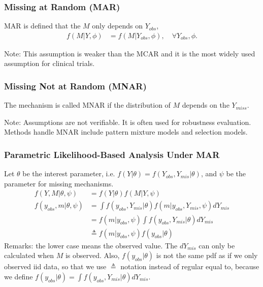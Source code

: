\documentclass[notes=no]{beamer}
\begin{document}
\begin{frame}
	\frametitle{Missing at Random (MAR)}
	\begin{definition}[MAR]
	MAR is defined that the $M$ only depends on $Y_{obs}$,
	\begin{align*}
	f(M | Y, \phi) &= f(M|Y_{obs}, \phi), \quad \forall Y_{obs}, \phi.
	\end{align*}
	\end{definition}
	Note: This assumption is weaker than the MCAR and it is the most widely used assumption for clinical trials.
\end{frame}

\begin{frame}
	\frametitle{Missing Not at Random (MNAR)}
	\begin{definition}[MNAR]
	The mechanism is called MNAR if the distribution of $M$ depends on the $Y_{miss}$.	
	\end{definition}
Note: Assumptions are not verifiable. It is often used for robustness evaluation. Methods handle MNAR include pattern mixture models and selection models.	
\end{frame}

\begin{frame}
	\frametitle{Parametric Likelihood-Based Analysis Under MAR}
		Let $\theta$ be the interest parameter, i.e. $f(Y|\theta) = f(Y_{obs}, Y_{mis}|\theta)$, and $\psi$ be the parameter for missing mechanisms. 
			\begin{align*}
		f(Y,M|\theta, \psi) &= f(Y|\theta) f(M|Y,\psi)\\
		f(y_{obs},m|\theta, \psi)&= \int f(y_{obs}, Y_{mis}|\theta) f(m|y_{obs}, Y_{mis},\psi) d Y_{mis} \\
		&= f(m|y_{obs}, \psi) \int f(y_{obs},Y_{mis}|\theta) dY_{mis}\\
		&\triangleq f(m|y_{obs}, \psi) f(y_{obs}|\theta)
		\end{align*}
Remarks: the lower case means the observed value. The $dY_{mis}$ can only be calculated when $M$ is observed. Also, $f(y_{obs}|\theta)$ is not the same pdf as if we only observed iid data, so that we use $\triangleq$ notation instead of regular equal to, because we define  $f(y_{obs}|\theta) = \int f(y_{obs},Y_{mis}|\theta) dY_{mis}$.		
\end{frame}
\end{document}
